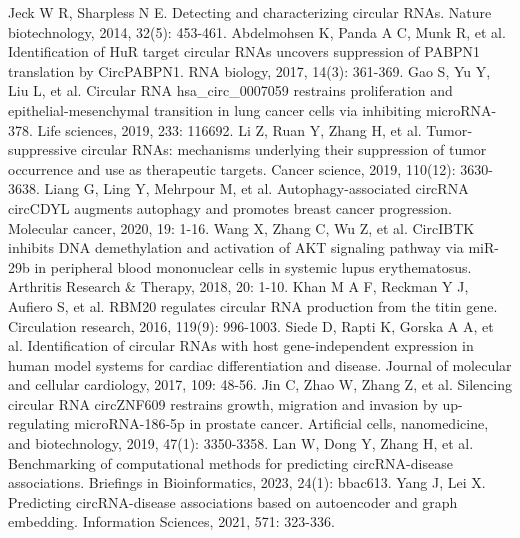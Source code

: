\documentclass{bioinfo}
\begin{document}
\begin{methods}
\end{methods}

\begin{thebibliography}{}
\normalsize
Jeck W R, Sharpless N E. Detecting and characterizing circular RNAs. Nature biotechnology, 2014, 32(5): 453-461.
Abdelmohsen K, Panda A C, Munk R, et al. Identification of HuR target circular RNAs uncovers suppression of PABPN1 translation by CircPABPN1. RNA biology, 2017, 14(3): 361-369.
Gao S, Yu Y, Liu L, et al. Circular RNA hsa\_circ\_0007059 restrains proliferation and epithelial-mesenchymal transition in lung cancer cells via inhibiting microRNA-378. Life sciences, 2019, 233: 116692.
Li Z, Ruan Y, Zhang H, et al. Tumor‐suppressive circular RNAs: mechanisms underlying their suppression of tumor occurrence and use as therapeutic targets. Cancer science, 2019, 110(12): 3630-3638.
Liang G, Ling Y, Mehrpour M, et al. Autophagy-associated circRNA circCDYL augments autophagy and promotes breast cancer progression. Molecular cancer, 2020, 19: 1-16.
Wang X, Zhang C, Wu Z, et al. CircIBTK inhibits DNA demethylation and activation of AKT signaling pathway via miR-29b in peripheral blood mononuclear cells in systemic lupus erythematosus. Arthritis Research \& Therapy, 2018, 20: 1-10.
Khan M A F, Reckman Y J, Aufiero S, et al. RBM20 regulates circular RNA production from the titin gene. Circulation research, 2016, 119(9): 996-1003.
Siede D, Rapti K, Gorska A A, et al. Identification of circular RNAs with host gene-independent expression in human model systems for cardiac differentiation and disease. Journal of molecular and cellular cardiology, 2017, 109: 48-56.
Jin C, Zhao W, Zhang Z, et al. Silencing circular RNA circZNF609 restrains growth, migration and invasion by up-regulating microRNA-186-5p in prostate cancer. Artificial cells, nanomedicine, and biotechnology, 2019, 47(1): 3350-3358.
Lan W, Dong Y, Zhang H, et al. Benchmarking of computational methods for predicting circRNA-disease associations. Briefings in Bioinformatics, 2023, 24(1): bbac613.
%
Yang J, Lei X. Predicting circRNA-disease associations based on autoencoder and graph embedding. Information Sciences, 2021, 571: 323-336.

\end{thebibliography}
\end{document}
